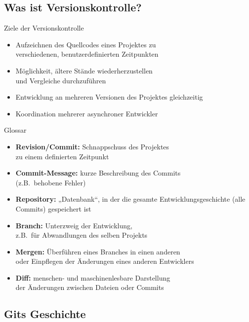 \subsection{Was ist Versionskontrolle?}

\begin{frame}{Ziele der Versionskontrolle}
\begin{itemize}
	\item Aufzeichnen des Quellcodes eines Projektes zu\\verschiedenen, benutzerdefinierten Zeitpunkten
	\item Möglichkeit, ältere Stände wiederherzustellen\\und Vergleiche durchzuführen
	\item Entwicklung an mehreren Versionen des Projektes gleichzeitig
	\item Koordination mehrerer asynchroner Entwickler
\end{itemize}
\end{frame}

\begin{frame}{Glossar}
\begin{itemize}
	\item \textbf{Revision\slash Commit:} Schnappschuss des Projektes\\zu einem definierten Zeitpunkt
	\item \textbf{Commit-Message:} kurze Beschreibung des Commits\\(z.B.\ behobene Fehler)
	\item \textbf{Repository:} „Datenbank“, in der die gesamte Entwicklungsgeschichte (alle Commits) gespeichert ist
	\item \textbf{Branch:} Unterzweig der Entwicklung,\\z.B.\ für Abwandlungen des selben Projekts
	\item \textbf{Mergen:} Überführen eines Branches in einen anderen\\oder Einpflegen der Änderungen eines anderen Entwicklers
	\item \textbf{Diff:} menschen- und maschinenlesbare Darstellung\\der Änderungen zwischen Dateien oder Commits
\end{itemize}
\end{frame}

\subsection{Gits Geschichte}

